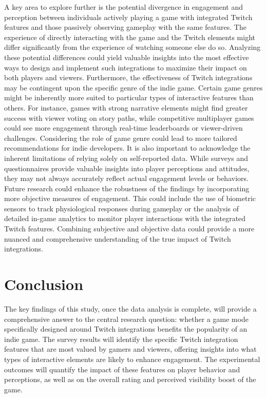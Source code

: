 \documentclass[conference]{IEEEtran}
\begin{document}
A key area to explore further is the potential divergence in engagement and perception between individuals actively playing a game with integrated Twitch features and those passively observing gameplay with the same features. The experience of directly interacting with the game and the Twitch elements might differ significantly from the experience of watching someone else do so. Analyzing these potential differences could yield valuable insights into the most effective ways to design and implement such integrations to maximize their impact on both players and viewers. Furthermore, the effectiveness of Twitch integrations may be contingent upon the specific genre of the indie game. Certain game genres might be inherently more suited to particular types of interactive features than others. For instance, games with strong narrative elements might find greater success with viewer voting on story paths, while competitive multiplayer games could see more engagement through real-time leaderboards or viewer-driven challenges. Considering the role of game genre could lead to more tailored recommendations for indie developers. It is also important to acknowledge the inherent limitations of relying solely on self-reported data. While surveys and questionnaires provide valuable insights into player perceptions and attitudes, they may not always accurately reflect actual engagement levels or behaviors. Future research could enhance the robustness of the findings by incorporating more objective measures of engagement. This could include the use of biometric sensors to track physiological responses during gameplay or the analysis of detailed in-game analytics to monitor player interactions with the integrated Twitch features. Combining subjective and objective data could provide a more nuanced and comprehensive understanding of the true impact of Twitch integrations.

\section{Conclusion}\label{sec:conclusion}

The key findings of this study, once the data analysis is complete, will provide a comprehensive answer to the central research question: whether a game mode specifically designed around Twitch integrations benefits the popularity of an indie game. The survey results will identify the specific Twitch integration features that are most valued by gamers and viewers, offering insights into what types of interactive elements are likely to enhance engagement. The experimental outcomes will quantify the impact of these features on player behavior and perceptions, as well as on the overall rating and perceived visibility boost of the game.
\end{document}
